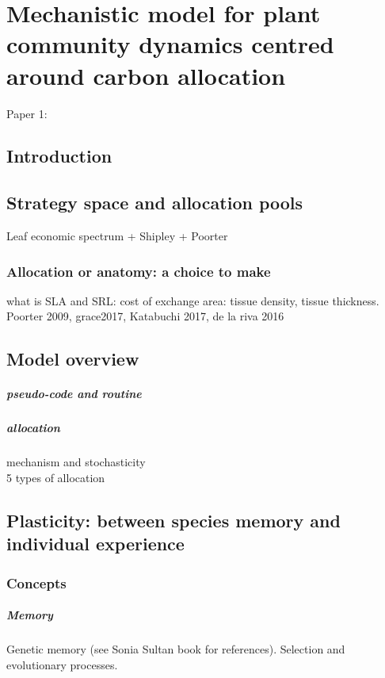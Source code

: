 

\chapter{Mechanistic model for plant community dynamics centred around carbon allocation}
Paper 1:
\section{Introduction}
\section{Strategy space and allocation pools}
Leaf economic spectrum + Shipley + Poorter
\subsection{Allocation or anatomy: a choice to make}
what is SLA and SRL: cost of exchange area: tissue density, tissue thickness. Poorter 2009, grace2017, Katabuchi 2017, de la riva 2016\\

\section{Model overview}
\paragraph{pseudo-code and routine}
\paragraph{allocation}
mechanism and stochasticity\\
5 types of allocation\\

\section{Plasticity: between species memory and individual experience}

\subsection{Concepts}
\paragraph{Memory} Genetic memory (see Sonia Sultan book for references). Selection and evolutionary processes.
